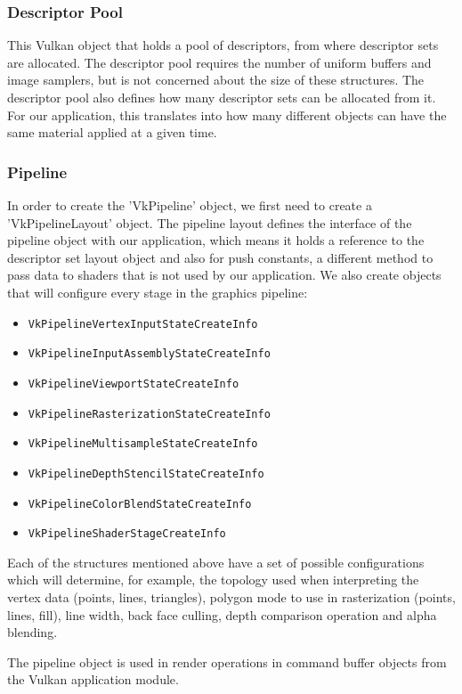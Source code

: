 \subsubsection{Descriptor Pool}
This Vulkan object that holds a pool of descriptors, from where descriptor sets are allocated. The descriptor pool requires the number of uniform buffers and image samplers, but is not concerned about the size of these structures. The descriptor pool also defines how many descriptor sets can be allocated from it. For our application, this translates into how many different objects can have the same material applied at a given time.

\subsubsection{Pipeline}
In order to create the 'VkPipeline' object, we first need to create a 'VkPipelineLayout' object. The pipeline layout defines the interface of the pipeline object with our application, which means it holds a reference to the descriptor set layout object and also for push constants, a different method to pass data to shaders that is not used by our application. We also create objects that will configure every stage in the graphics pipeline:

\begin{itemize}
    \item \texttt{VkPipelineVertexInputStateCreateInfo}
    \item \texttt{VkPipelineInputAssemblyStateCreateInfo}
    \item \texttt{VkPipelineViewportStateCreateInfo}
    \item \texttt{VkPipelineRasterizationStateCreateInfo}
    \item \texttt{VkPipelineMultisampleStateCreateInfo}
    \item \texttt{VkPipelineDepthStencilStateCreateInfo}
    \item \texttt{VkPipelineColorBlendStateCreateInfo}
    \item \texttt{VkPipelineShaderStageCreateInfo}
\end{itemize}

Each of the structures mentioned above have a set of possible configurations which will determine, for example, the topology used when interpreting the vertex data (points, lines, triangles), polygon mode to use in rasterization (points, lines, fill), line width, back face culling, depth comparison operation and alpha blending.

The pipeline object is used in render operations in command buffer objects from the Vulkan application module.
